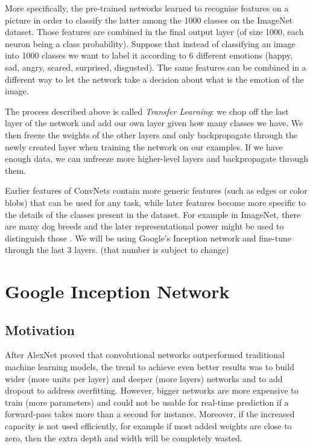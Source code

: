 More specifically, the pre-trained networks learned to recognise features on a picture in order to classify the latter among the 1000 classes on the ImageNet dataset. Those features are combined in the final output layer (of size 1000, each neuron being a class probability). Suppose that instead of classifying an image into 1000 classes we want to label it according to 6 different emotions (happy, sad, angry, scared, surprised, disgusted). The same features can be combined in a different way to let the network take a decision about what is the emotion of the image.

The process described above is called {\em Transfer Learning}: we chop off the last layer of the network and add our own layer given how many classes we have. We then freeze the weights of the other layers and only backpropagate through the newly created layer when training the network on our examples. If we have enough data, we can unfreeze more higher-level layers and backpropagate through them.

Earlier features of ConvNets contain more generic features (such as edges or color blobs) that can be used for any task, while later features become more specific to the details of the classes present in the dataset. For example in ImageNet, there are many dog breeds and the later representational power might be used to distinguish those \cite{transfer}. We will be using Google's Inception network and fine-tune through the last 3 layers. (that number is subject to change)

\section{Google Inception Network}

\subsection{Motivation}
After AlexNet proved that convolutional networks outperformed traditional machine learning models, the trend to achieve even better results was to build wider (more units per layer) and deeper (more layers) networks and to add dropout to address overfitting. However, bigger networks are more expensive to train (more parameters) and could not be usable for real-time prediction if a forward-pass takes more than a second for instance. Moreover, if the increased capacity is not used efficiently, for example if most added weights are close to zero, then the extra depth and width will be completely wasted.

